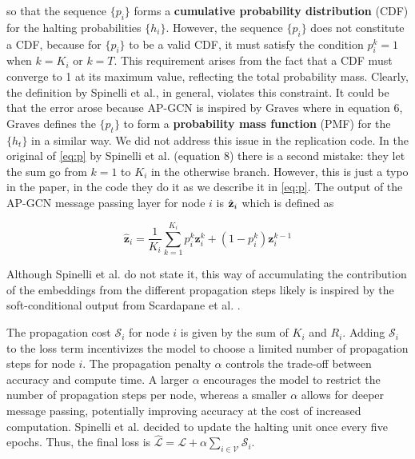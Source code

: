\documentclass{gdl}
\begin{document}
\noindent so that the sequence $\{p_i\}$ forms a \textbf{cumulative probability distribution} (CDF) for the halting probabilities $\{h_i\}$. However, the sequence $\{p_i\}$ does not constitute a CDF, because for $\{p_i\}$ to be a valid CDF, it must satisfy the condition $p_i^k = 1$ when $k = K_i$ or $k = T$. This requirement arises from the fact that a CDF must converge to 1 at its maximum value, reflecting the total probability mass. Clearly, the definition by Spinelli et al., in general, violates this constraint. It could be that the error arose because AP-GCN is inspired by Graves \cite{graves2017} where in equation 6, Graves defines the $\{p_t\}$ to form a \textbf{probability mass function} (PMF) for the $\{h_t\}$ in a similar way. We did not address this issue in the replication code. In the original of \autoref{eq:p} by Spinelli et al. (equation 8) there is a second mistake: they let the sum go from $k=1$ to $K_i$ in the otherwise branch. However, this is just a typo in the paper, in the code they do it as we describe it in \autoref{eq:p}.
The output of the AP-GCN message passing layer for node $i$ is $\hat{\bf{z}}_i$ which is defined as

\begin{equation}
\hat{\mathbf{z}}_i = \frac{1}{K_i} \sum_{k=1}^{K_i} p_i^k \mathbf{z}^k_i + (1-p^k_i) \mathbf{z}_i^{k-1} 
\label{eq:aggregate}
\end{equation}

\noindent Although Spinelli et al. do not state it, this way of accumulating the contribution of the embeddings from the different propagation steps likely is inspired by the soft-conditional output from Scardapane et al. \cite{scardapane2020}.

 The propagation cost $\mathcal{S}_i$ for node $i$ is given by the sum of $K_i$ and $R_i$. Adding $\mathcal{S}_i$ to the loss term incentivizes the model to choose a limited number of propagation steps for node $i$. The propagation penalty $\alpha$ controls the trade-off between accuracy and compute time. A larger $\alpha$ encourages the model to restrict the number of propagation steps per node, whereas a smaller $\alpha$ allows for deeper message passing, potentially improving accuracy at the cost of increased computation. Spinelli et al. decided to update the halting unit once every five epochs. Thus, the final loss is $ \mathcal{\hat{L}} = \mathcal{L} + \alpha \sum_{i\in \mathcal{V}} \mathcal{S}_i $.
\end{document}
